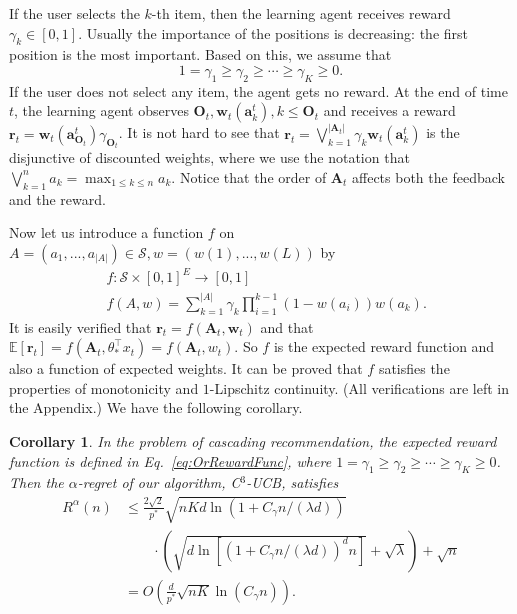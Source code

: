\documentclass{article}
\newcommand{\EE}{\mathbb{E}}
\newcommand{\bA}{\mathbf{A}}
\newcommand{\ba}{\mathbf{a}}
\newcommand{\bO}{\mathbf{O}}
\newcommand{\br}{\mathbf{r}}
\newcommand{\bw}{\mathbf{w}}
\newcommand{\cO}{\mathcal{O}}
\newcommand{\cS}{\mathcal{S}}
\newcommand{\abs}[1]{\left| #1 \right|}
\newtheorem{corollary}[theorem]{Corollary}%
\begin{document}
If the user selects the $k$-th item, then the learning agent receives reward $\gamma_k \in [0,1]$. Usually the importance of the positions is decreasing: the first position is the most important. Based on this, we assume that
$$
1 = \gamma_1 \geq \gamma_2 \geq \cdots \geq \gamma_K \geq 0.
$$
If the user does not select any item, the agent gets no reward. At the end of time $t$, the learning agent observes $\bO_t, \bw_t(\ba_k^t), k \leq \bO_t$ and receives a reward
$\br_t = \bw_t(\ba_{\bO_t}^t) \gamma_{\bO_t}$. It is not hard to see that $\br_t = \bigvee_{k=1}^{\abs{\bA_t}} \gamma_k \bw_t(\ba_k^t)$ is the disjunctive of discounted weights,
where we use the notation that $\bigvee_{k=1}^n a_k = \max_{1 \leq k \leq n} a_k$. Notice that the order of $\bA_t$ affects both the feedback and the reward.

Now let us introduce a function $f$ on $A = (a_1,...,a_{\abs{A}}) \in \cS, w = (w(1),...,w(L))$ by
\begin{align}
&f : \cS \times [0,1]^E \to [0,1] \nonumber \\
&f(A,w) = \sum_{k = 1}^{\abs{A}} \gamma_{k} \prod_{i=1}^{k-1} (1 - w(a_i)) w(a_k). \label{eq:OrRewardFunc}
\end{align}
It is easily verified that $\br_t = f(\bA_t, \bw_t)$ and that $\EE[\br_t] = f(\bA_t, \theta_{\ast}^{\top}x_t) = f(\bA_t, w_t)$. So $f$ is the expected reward function and also a function of expected weights. It can be proved that $f$ satisfies the properties of monotonicity and $1$-Lipschitz continuity. (All verifications are left in the Appendix.) 
We have the following corollary.
\begin{corollary}
	\label{cor:or}
	In the problem of cascading recommendation, the expected reward function is defined in Eq.~\eqref{eq:OrRewardFunc}, where $1 = \gamma_1 \geq \gamma_2 \geq \cdots \geq \gamma_K \geq 0$. Then the $\alpha$-regret of our algorithm, C$^3$-UCB, satisfies
	\begin{align}
		R^{\alpha}(n) &\le \frac{2\sqrt{2}}{p^*} \sqrt{nKd\ln(1 + C_\gamma n/(\lambda d))}  \nonumber \\
		&\qquad \cdot \left(\sqrt{d\ln[(1 + C_\gamma n/(\lambda d))^d n]} + \sqrt{\lambda}\right) + \sqrt{n}\nonumber \\
		&=O\left(\frac{d}{p^*} \sqrt{nK} \ln (C_\gamma n) \right).
	\end{align}
\end{corollary}
\end{document}
